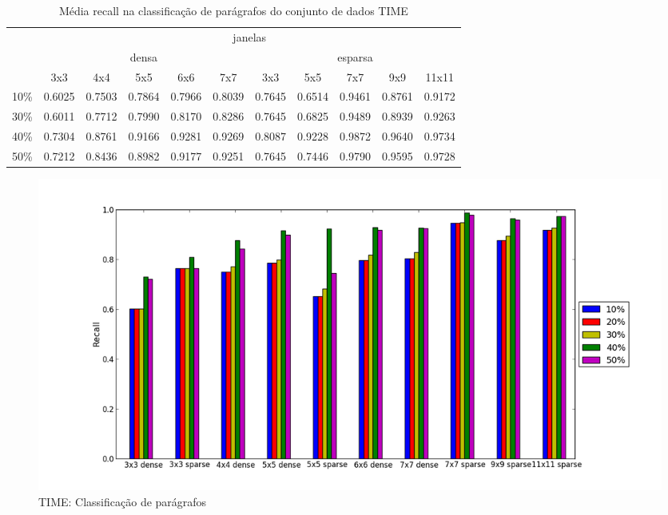 \documentclass[a4paper,11pt]{article}
\begin{document}
  \begin{center}
    \begin{table}[p]
      \caption{Média recall na classificação de parágrafos do conjunto de dados TIME}
      \begin{tabular}{ l | c c c c c || c c c c c | }
        \cline{2-11}
        & \multicolumn{10}{|c|}{janelas} \\
        \cline{2-11}
        & \multicolumn{5}{c||}{densa} & \multicolumn{5}{c|}{esparsa} \\
        \cline{2-11}
        & 3x3 & 4x4 & 5x5 & 6x6 & 7x7 & 3x3 & 5x5 & 7x7 & 9x9 & 11x11 \\
        \hline
        \multicolumn{1}{|l|}{10\%}& 0.6025& 0.7503& 0.7864& 0.7966& 0.8039& 0.7645& 0.6514& 0.9461& 0.8761& 0.9172\\
        \multicolumn{1}{|l|}{30\%}& 0.6011& 0.7712& 0.7990& 0.8170& 0.8286& 0.7645& 0.6825& 0.9489& 0.8939& 0.9263\\
        \multicolumn{1}{|l|}{40\%}& 0.7304& 0.8761& 0.9166& 0.9281& 0.9269& 0.8087& 0.9228& 0.9872& 0.9640& 0.9734\\
        \multicolumn{1}{|l|}{50\%}& 0.7212& 0.8436& 0.8982& 0.9177& 0.9251& 0.7645& 0.7446& 0.9790& 0.9595& 0.9728\\
        \hline  
      \end{tabular}
    \end{table}
  \end{center}

  \begin{figure}[p]
    \centerline{\includegraphics[width=1.2\textwidth]{assets/experiment_charts/time_TextRegion_paragraph_recall_or_sensitivity.png}}
    \caption{TIME: Classificação de parágrafos}
    \label{fig:time_TextRegion_paragraph_recall_or_sensitivity}
  \end{figure}  
\end{document}
